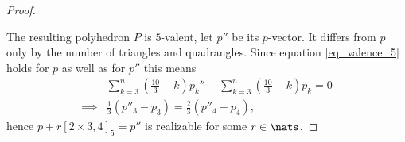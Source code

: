 \begin{theorem}
\begin{proof}
\begin{figure}[hptt]
   \end{figure}
   The resulting polyhedron $P$ is $5$-valent, let $p''$ be its $p$-vector. It differs from $p$ only by the number of triangles and quadrangles. Since equation \ref{eq_valence_5} holds for $p$ as well as for $p''$ this means
   \begin{align*}
     & \sum_{k=3}^n \left( \frac{10}{3} - k \right) p_k'' - \sum_{k=3}^n \left( \frac{10}{3} - k \right) p_k = 0 \\
     \implies& \frac{1}{3} (p''_3 - p_3) = \frac{2}{3} (p''_4 - p_4),
   \end{align*}
   hence $p + r [2 \times 3, 4]_5 = p''$ is realizable for some $r \in \nats$.
  \end{proof}
\end{theorem}

